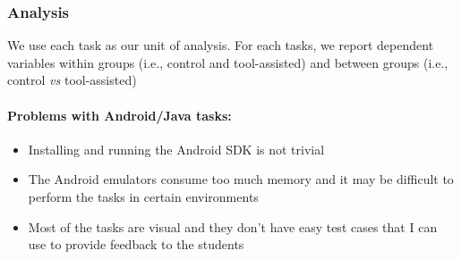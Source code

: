 {\subsubsection{Analysis}


We use each task as our unit of analysis. For each tasks, we report dependent variables within groups (i.e., control and tool-assisted) and between groups (i.e., control \textit{vs} tool-assisted)



\clearpage



\smallskip
\paragraph{\textbf{Problems with Android/Java tasks:}}

\begin{itemize}
    \item Installing and running the Android SDK is not trivial
    \item The Android emulators consume too much memory and it may be difficult to perform the tasks in certain environments
    \item Most of the tasks are visual and they don't have easy test cases that I can use to provide feedback to the students
\end{itemize}








}

